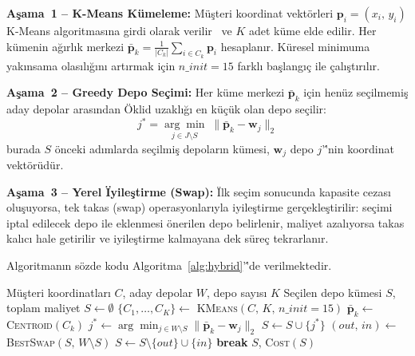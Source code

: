 \documentclass[conference]{IEEEtran}
\begin{document}
\textbf{A\c{s}ama~1 -- K-Means K\"{u}meleme:}
M\"{u}\c{s}teri koordinat vekt\"{o}rleri
$\mathbf{p}_i = (x_i,\, y_i)$ K-Means algoritmas{\i}na girdi olarak
verilir~\cite{lloyd1982} ve $K$ adet k\"{u}me elde edilir.
Her k\"{u}menin a\u{g}{\i}rl{\i}k merkezi
$\bar{\mathbf{p}}_k = \frac{1}{|C_k|}\sum_{i \in C_k}\mathbf{p}_i$
hesaplan{\i}r.
K\"{u}resel minimuma yak{\i}nsama olas{\i}l{\i}\u{g}{\i}n{\i} art{\i}rmak
i\c{c}in $n\_init{=}15$ farkl{\i} ba\c{s}lang{\i}\c{c} ile \c{c}al{\i}\c{s}t{\i}r{\i}l{\i}r.

\textbf{A\c{s}ama~2 -- Greedy Depo Se\c{c}imi:}
Her k\"{u}me merkezi $\bar{\mathbf{p}}_k$ i\c{c}in hen\"{u}z se\c{c}ilmemi\c{s}
aday depolar aras{\i}ndan \"{O}klid uzakl{\i}\u{g}{\i} en k\"{u}\c{c}\"{u}k
olan depo se\c{c}ilir:
\begin{equation}
  j^* = \underset{j \in J \setminus S}{\arg\min}\;
        \|\bar{\mathbf{p}}_k - \mathbf{w}_j\|_2
  \label{eq:greedy}
\end{equation}
burada $S$ \"{o}nceki ad{\i}mlarda se\c{c}ilmi\c{s} depolar{\i}n k\"{u}mesi,
$\mathbf{w}_j$ depo $j$'\''nin koordinat vekt\"{o}r\"{u}d\"{u}r.

\textbf{A\c{s}ama~3 -- Yerel \"{I}yile\c{s}tirme (Swap):}
\"{I}lk se\c{c}im sonucunda kapasite cezas{\i} olu\c{s}uyorsa, tek takas
(swap) operasyonlar{\i}yla iyile\c{s}tirme ger\c{c}ekle\c{s}tirilir:
se\c{c}imi iptal edilecek depo ile eklenmesi \"{o}nerilen depo belirlenir,
maliyet azal{\i}yorsa takas kal{\i}c{\i} hale getirilir ve iyile\c{s}tirme
kalmayana dek s\"{u}re\c{c} tekrarlan{\i}r.

Algoritman{\i}n s\"{o}zde kodu Algoritma~\ref{alg:hybrid}'\''de
verilmektedir.

\begin{algorithm}[H]
\caption{Hibrit K-Means + Greedy WLP}
\label{alg:hybrid}
\begin{algorithmic}[1]
\REQUIRE M\"{u}\c{s}teri koordinatlar{\i} $C$, aday depolar $W$, depo say{\i}s{\i} $K$
\ENSURE Se\c{c}ilen depo k\"{u}mesi $S$, toplam maliyet
\STATE $S \leftarrow \emptyset$
\STATE $\{C_1,\ldots,C_K\} \leftarrow$ \textsc{KMeans}$(C,\,K,\,n\_init{=}15)$
  \STATE $\bar{\mathbf{p}}_k \leftarrow$ \textsc{Centroid}$(C_k)$
  \STATE $j^* \leftarrow \arg\min_{j \in W \setminus S}
         \|\bar{\mathbf{p}}_k - \mathbf{w}_j\|_2$
  \STATE $S \leftarrow S \cup \{j^*\}$
\ENDFOR
{}
  \STATE $(out,\,in) \leftarrow$ \textsc{BestSwap}$(S,\,W \setminus S)$
    \STATE $S \leftarrow S \setminus \{out\} \cup \{in\}$
  \ELSE
    \STATE \textbf{break}
  \ENDIF
\ENDWHILE
\RETURN $S$, \textsc{Cost}$(S)$
\end{algorithmic}
\end{algorithm}
\end{document}
